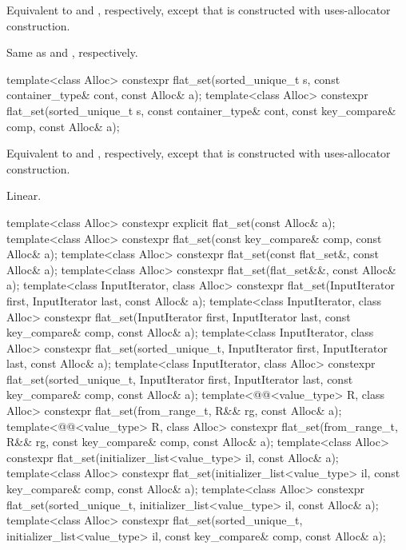 \begin{itemdescr}
\pnum
\effects
Equivalent to
 and , respectively,
except that  is constructed with
uses-allocator construction.

\pnum
\complexity
Same as  and , respectively.
\end{itemdescr}

%
\begin{itemdecl}
template<class Alloc>
  constexpr flat_set(sorted_unique_t s, const container_type& cont, const Alloc& a);
template<class Alloc>
  constexpr flat_set(sorted_unique_t s, const container_type& cont,
                     const key_compare& comp, const Alloc& a);
\end{itemdecl}

\begin{itemdescr}
\pnum
\effects
Equivalent to
 and , respectively,
except that  is constructed with
uses-allocator construction.

\pnum
\complexity
Linear.
\end{itemdescr}

%
\begin{itemdecl}
template<class Alloc>
  constexpr explicit flat_set(const Alloc& a);
template<class Alloc>
  constexpr flat_set(const key_compare& comp, const Alloc& a);
template<class Alloc>
  constexpr flat_set(const flat_set&, const Alloc& a);
template<class Alloc>
  constexpr flat_set(flat_set&&, const Alloc& a);
template<class InputIterator, class Alloc>
  constexpr flat_set(InputIterator first, InputIterator last, const Alloc& a);
template<class InputIterator, class Alloc>
  constexpr flat_set(InputIterator first, InputIterator last, const key_compare& comp,
                     const Alloc& a);
template<class InputIterator, class Alloc>
  constexpr flat_set(sorted_unique_t, InputIterator first, InputIterator last, const Alloc& a);
template<class InputIterator, class Alloc>
  constexpr flat_set(sorted_unique_t, InputIterator first, InputIterator last,
                     const key_compare& comp, const Alloc& a);
template<@@<value_type> R, class Alloc>
  constexpr flat_set(from_range_t, R&& rg, const Alloc& a);
template<@@<value_type> R, class Alloc>
  constexpr flat_set(from_range_t, R&& rg, const key_compare& comp, const Alloc& a);
template<class Alloc>
  constexpr flat_set(initializer_list<value_type> il, const Alloc& a);
template<class Alloc>
  constexpr flat_set(initializer_list<value_type> il, const key_compare& comp, const Alloc& a);
template<class Alloc>
  constexpr flat_set(sorted_unique_t, initializer_list<value_type> il, const Alloc& a);
template<class Alloc>
  constexpr flat_set(sorted_unique_t, initializer_list<value_type> il,
                     const key_compare& comp, const Alloc& a);
\end{itemdecl}

